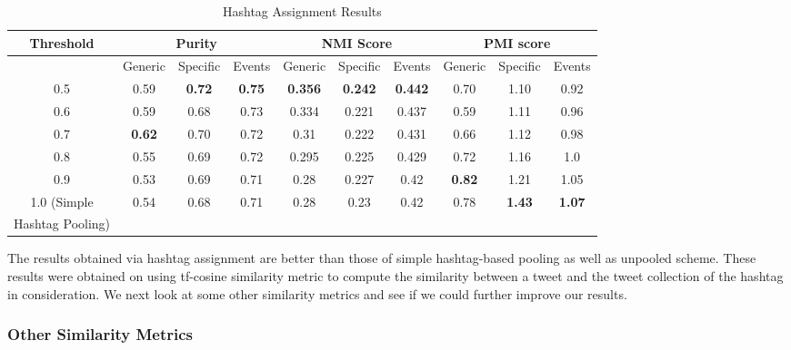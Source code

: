 \documentclass[10pt,a5paper,twoside]{article}
\begin{document}
\begin{table}[!h]
\centering
\resizebox{14cm}{!} 
{
	\begin{tabular}{|c|ccc|ccc|ccc|}
	\hline
	\footnotesize{Threshold}  & \multicolumn {3}{c}{Purity} & \multicolumn {3}{c}{NMI Score} & \multicolumn {3}{c|}{PMI score}\\
	\hline
	 & Generic & Specific & Events &  Generic & Specific & Events &  Generic & Specific & Events\\
	\hline
	0.5 & 0.59 & \textbf{0.72} & \textbf{0.75} & \textbf{0.356} & \textbf{0.242} & \textbf{0.442} & 0.70 & 1.10 & 0.92 \\
	\hline
	0.6 & 0.59 & 0.68 & 0.73 & 0.334 & 0.221 & 0.437 & 0.59 & 1.11 & 0.96 \\
	\hline
	0.7 & \textbf{0.62} & 0.70 & 0.72 & 0.31 & 0.222 & 0.431 & 0.66 & 1.12 & 0.98 \\
	\hline
	0.8 & 0.55 & 0.69 & 0.72 & 0.295 & 0.225 & 0.429 & 0.72 & 1.16 & 1.0 \\
	\hline
	0.9 & 0.53 & 0.69 & 0.71 & 0.28 & 0.227 & 0.42 & \textbf{0.82} & 1.21 & 1.05 \\
	\hline
	1.0 (\small Simple & 0.54 & 0.68 & 0.71 & 0.28 & 0.23 & 0.42 & 0.78 & \textbf{1.43} & \textbf{1.07} \\
	\small Hashtag Pooling) & & & & & & & & & \\
	\hline
	\end{tabular}
}
\caption{Hashtag Assignment Results}\label{tbl-9}
\end{table}

The results obtained via hashtag assignment are better than those of
simple hashtag-based pooling as well as unpooled scheme. These results
were obtained on using tf-cosine similarity metric to compute the
similarity between a tweet and the tweet collection of the hashtag in
consideration. We next look at some other similarity metrics and see
if we could further improve our results.

\subsubsection{Other Similarity Metrics}
\end{document}
